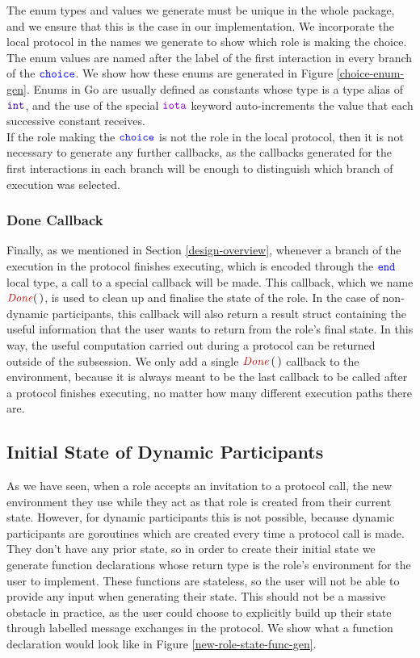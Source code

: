 \documentclass[12pt,twoside]{report}
\begin{document}
The enum types and values we generate must be unique in the whole package, and we ensure that this is the case in our implementation. We incorporate the local protocol in the names we generate to show which role is making the choice. The enum values are named after the label of the first interaction in every branch of the ${\color{blue}\mathtt{choice}}$. We show how these enums are generated in Figure \ref{choice-enum-gen}. Enums in Go are usually defined as constants whose type is a type alias of $\typename{int}$, and the use of the special $\goiota$ keyword auto-increments the value that each successive constant receives.\\

If the role making the ${\color{blue}\mathtt{choice}}$ is not the role in the local protocol, then it is not necessary to generate any further callbacks, as the callbacks generated for the first interactions in each branch will be enough to distinguish which branch of execution was selected.

\subsubsection{Done Callback}
Finally, as we mentioned in Section \ref{design-overview}, whenever a branch of the execution in the protocol finishes executing, which is encoded through the ${\color{blue}\mathtt{end}}$ local type, a call to a special callback will be made. This callback, which we name $\functionname{Done}(\,)$, is used to clean up and finalise the state of the role. In the case of non-dynamic participants, this callback will also return a result struct containing the useful information that the user wants to return from the role's final state. In this way, the useful computation carried out during a protocol can be returned outside of the subsession. We only add a single $\functionname{Done}\,(\,)$ callback to the environment, because it is always meant to be the last callback to be called after a protocol finishes executing, no matter how many different execution paths there are.

\subsection{Initial State of Dynamic Participants}\label{dyn-participant-state}
As we have seen, when a role accepts an invitation to a protocol call, the new environment they use while they act as that role is created from their current state. However, for dynamic participants this is not possible, because dynamic participants are goroutines which are created every time a protocol call is made. They don't have any prior state, so in order to create their initial state we generate function declarations whose return type is the role's environment for the user to implement. These functions are stateless, so the user will not be able to provide any input when generating their state. This should not be a massive obstacle in practice, as the user could choose to explicitly build up their state through labelled message exchanges in the protocol. We show what a function declaration would look like in Figure \ref{new-role-state-func-gen}.
\\
\end{document}
